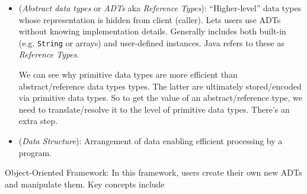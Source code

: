 \documentclass[12pt]{article}
\theoremstyle{plain}
\theoremstyle{definition}
\theoremstyle{remark}
\begin{document}
\begin{itemize}
  \item
    (\emph{Abstract data types} or \emph{ADTs} aka \emph{Reference Types}):
    ``Higher-level'' data types whose representation is hidden from
    client (caller).
    Lets users use ADTs without knowing implementation details.
    Generally includes both built-in (e.g. \texttt{String} or arrays)
    and user-defined instances.
    Java refers to these as \emph{Reference Types}.

    We can see why primitive data types are more efficient than
    abstract/reference data types types.
    The latter are ultimately stored/encoded via primitive data
    types. So to get the value of an abstract/reference type, we need to
    translate/resolve it to the level of primitive data types.
    There's an extra step.


  \item (\emph{Data Structure}): Arrangement of data enabling
    efficient processing by a program.
\end{itemize}
Object-Oriented Framework:
In this framework, users create their own new ADTs and manipulate them.
Key concepts include
\end{document}
